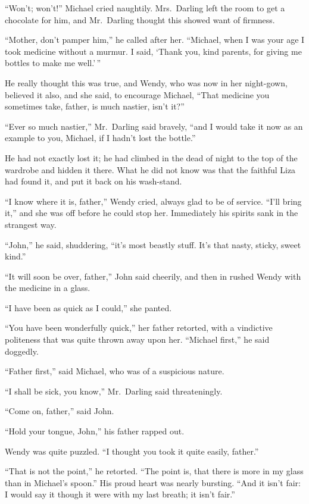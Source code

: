 ``Won't; won't!'' Michael cried naughtily. Mrs.\ Darling left the room to get a
chocolate for him, and Mr.\ Darling thought this showed want of firmness.

``Mother, don't pamper him,'' he called after her. ``Michael, when I was your
age I took medicine without a murmur. I said, `Thank you, kind parents, for
giving me bottles to make me well.'\,''

He really thought this was true, and Wendy, who was now in her night-gown,
believed it also, and she said, to encourage Michael, ``That medicine you
sometimes take, father, is much nastier, isn't it?''

``Ever so much nastier,'' Mr.\ Darling said bravely, ``and I would take it now
as an example to you, Michael, if I hadn't lost the bottle.''

He had not exactly lost it; he had climbed in the dead of night to the top of
the wardrobe and hidden it there. What he did not know was that the faithful
Liza had found it, and put it back on his wash-stand.

``I know where it is, father,'' Wendy cried, always glad to be of service.
``I'll bring it,'' and she was off before he could stop her. Immediately his
spirits sank in the strangest way.

``John,'' he said, shuddering, ``it's most beastly stuff. It's that nasty,
sticky, sweet kind.''

``It will soon be over, father,'' John said cheerily, and then in rushed Wendy
with the medicine in a glass.

``I have been as quick as I could,'' she panted.

``You have been wonderfully quick,'' her father retorted, with a vindictive
politeness that was quite thrown away upon her. ``Michael first,'' he said
doggedly.

``Father first,'' said Michael, who was of a suspicious nature.

``I shall be sick, you know,'' Mr.\ Darling said threateningly.

``Come on, father,'' said John.

``Hold your tongue, John,'' his father rapped out.

Wendy was quite puzzled. ``I thought you took it quite easily, father.''

``That is not the point,'' he retorted. ``The point is, that there is more in my
glass than in Michael's spoon.'' His proud heart was nearly bursting. ``And it
isn't fair: I would say it though it were with my last breath; it isn't fair.''

